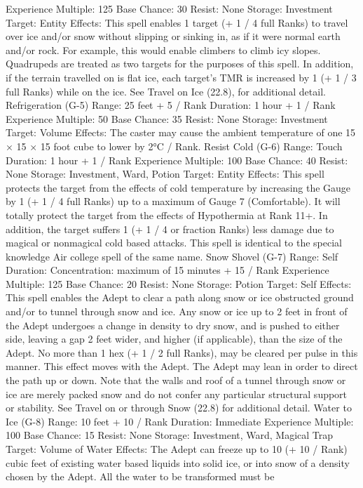 \documentclass[a4paper]{article}
\begin{document}
\begin{multicols}{3}
Experience Multiple: 125
Base Chance: 30%
Resist: None
Storage: Investment
Target: Entity
Effects: This spell enables 1 target (+ 1 / 4 full
Ranks) to travel over ice and/or snow without
slipping or sinking in, as if it were normal earth
and/or rock. For example, this would enable climbers to climb icy slopes. Quadrupeds are treated as
two targets for the purposes of this spell. In addition, if the terrain travelled on is flat ice, each
target’s TMR is increased by 1 (+ 1 / 3 full Ranks)
while on the ice. See Travel on Ice (22.8), for
additional detail.
Refrigeration (G-5)
Range: 25 feet + 5 / Rank
Duration: 1 hour + 1 / Rank
Experience Multiple: 50
Base Chance: 35%
Resist: None
Storage: Investment
Target: Volume
Effects: The caster may cause the ambient temperature of one 15 × 15 × 15 foot cube to lower by 2°C
/ Rank.
Resist Cold (G-6)
Range: Touch
Duration: 1 hour + 1 / Rank
Experience Multiple: 100
Base Chance: 40%
Resist: None
Storage: Investment, Ward, Potion
Target: Entity
Effects: This spell protects the target from the
effects of cold temperature by increasing the
Gauge by 1 (+ 1 / 4 full Ranks) up to a maximum
of Gauge 7 (Comfortable). It will totally protect the
target from the effects of Hypothermia at Rank
11+. In addition, the target suffers 1 (+ 1 / 4 or
fraction Ranks) less damage due to magical or nonmagical cold based attacks. This spell is identical
to the special knowledge Air college spell of the
same name.
Snow Shovel (G-7)
Range: Self
Duration: Concentration: maximum of 15 minutes
+ 15 / Rank
Experience Multiple: 125
Base Chance: 20%
Resist: None
Storage: Potion
Target: Self
Effects: This spell enables the Adept to clear a path
along snow or ice obstructed ground and/or to
tunnel through snow and ice. Any snow or ice up
to 2 feet in front of the Adept undergoes a change
in density to dry snow, and is pushed to either side,
leaving a gap 2 feet wider, and higher (if applicable), than the size of the Adept. No more than 1
hex (+ 1 / 2 full Ranks), may be cleared per pulse
in this manner. This effect moves with the Adept.
The Adept may lean in order to direct the path up
or down. Note that the walls and roof of a tunnel
through snow or ice are merely packed snow and
do not confer any particular structural support or
stability. See Travel on or through Snow (22.8) for
additional detail.
Water to Ice (G-8)
Range: 10 feet + 10 / Rank
Duration: Immediate
Experience Multiple: 100
Base Chance: 15%
Resist: None
Storage: Investment, Ward, Magical Trap
Target: Volume of Water
Effects: The Adept can freeze up to 10 (+ 10 /
Rank) cubic feet of existing water based liquids
into solid ice, or into snow of a density chosen by
the Adept. All the water to be transformed must be


\end{multicols}
\end{document}
